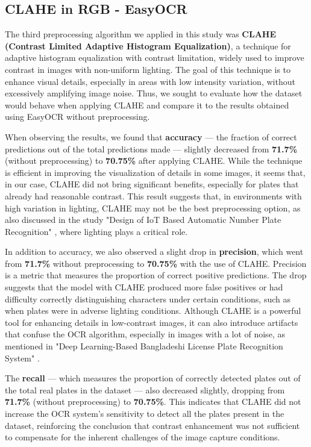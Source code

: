 \documentclass[conference]{IEEEtran}
\begin{document}
	\subsection{CLAHE in RGB - EasyOCR}
	
	The third preprocessing algorithm we applied in this study was \textbf{CLAHE (Contrast Limited Adaptive Histogram Equalization)}, a technique for adaptive histogram equalization with contrast limitation, widely used to improve contrast in images with non-uniform lighting. The goal of this technique is to enhance visual details, especially in areas with low intensity variation, without excessively amplifying image noise. Thus, we sought to evaluate how the dataset would behave when applying CLAHE and compare it to the results obtained using EasyOCR without preprocessing.
	
	When observing the results, we found that \textbf{accuracy} — the fraction of correct predictions out of the total predictions made — slightly decreased from \textbf{71.7\%} (without preprocessing) to \textbf{70.75\%} after applying CLAHE. While the technique is efficient in improving the visualization of details in some images, it seems that, in our case, CLAHE did not bring significant benefits, especially for plates that already had reasonable contrast. This result suggests that, in environments with high variation in lighting, CLAHE may not be the best preprocessing option, as also discussed in the study "Design of IoT Based Automatic Number Plate Recognition" \cite{b10}, where lighting plays a critical role.
	
	In addition to accuracy, we also observed a slight drop in \textbf{precision}, which went from \textbf{71.7\%} without preprocessing to \textbf{70.75\%} with the use of CLAHE. Precision is a metric that measures the proportion of correct positive predictions. The drop suggests that the model with CLAHE produced more false positives or had difficulty correctly distinguishing characters under certain conditions, such as when plates were in adverse lighting conditions. Although CLAHE is a powerful tool for enhancing details in low-contrast images, it can also introduce artifacts that confuse the OCR algorithm, especially in images with a lot of noise, as mentioned in "Deep Learning-Based Bangladeshi License Plate Recognition System" \cite{b11}.
	
	The \textbf{recall} — which measures the proportion of correctly detected plates out of the total real plates in the dataset — also decreased slightly, dropping from \textbf{71.7\%} (without preprocessing) to \textbf{70.75\%}. This indicates that CLAHE did not increase the OCR system's sensitivity to detect all the plates present in the dataset, reinforcing the conclusion that contrast enhancement was not sufficient to compensate for the inherent challenges of the image capture conditions.
	
\end{document}
